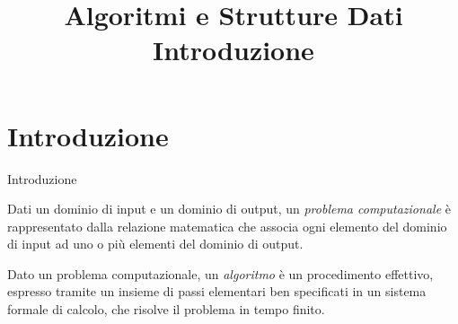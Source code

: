 
\title[ASD - Introduzione]{\textbf{Algoritmi e Strutture Dati}\\[24pt]Introduzione}
\usepackage{epigraph}

\graphicspath{{figs/01/}}



\FrameTitle{}

\FrameContent


\section{Introduzione}

\begin{frame}{Introduzione}

\vspace{-9pt}
\begin{myboxtitle}
Dati un dominio di input e un dominio di output, un \emph{\alert{problema computazionale}} 
è rappresentato dalla \alert{relazione matematica} che associa ogni elemento del dominio di input ad uno o più elementi del dominio di output.
\end{myboxtitle}

\begin{myboxtitle}[Algoritmo]
Dato un problema computazionale, un \emph{\alert{algoritmo}}  è un procedimento 
\alert{effettivo}, 
espresso tramite un insieme di \alert{passi elementari ben specificati} 
in un sistema \alert{formale} di calcolo, che risolve il problema in tempo \alert{finito}.
\end{myboxtitle}

	
\end{frame}

